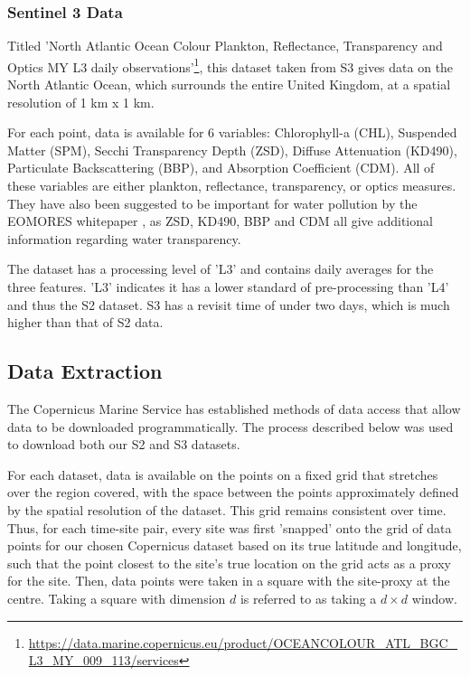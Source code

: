 \documentclass[a4paper,11pt]{report}
\begin{document}
\subsubsection{Sentinel 3 Data}

Titled 'North Atlantic Ocean Colour Plankton, Reflectance, Transparency and Optics MY L3 daily observations'\footnote{\href{https://data.marine.copernicus.eu/product/OCEANCOLOUR_ATL_BGC_L3_MY_009_113/services}{https://data.marine.copernicus.eu/product/OCEANCOLOUR\_ATL\_BGC\_L3\_MY\_009\_113/services}}, this dataset taken from S3 gives data on the North Atlantic Ocean, which surrounds the entire United Kingdom, at a spatial resolution of 1 km x 1 km. 

For each point, data is available for 6 variables: Chlorophyll-a (CHL), Suspended Matter (SPM), Secchi Transparency Depth (ZSD), Diffuse Attenuation (KD490), Particulate Backscattering (BBP), and Absorption Coefficient (CDM). All of these variables are either plankton, reflectance, transparency, or optics measures. They have also been suggested to be important for water pollution by the EOMORES whitepaper \citep{papathanasopoulou2019satellite}, as ZSD, KD490, BBP and CDM all give additional information regarding water transparency. 

The dataset has a processing level of 'L3' and contains daily averages for the three features. 'L3' indicates it has a lower standard of pre-processing than 'L4' and thus the S2 dataset. S3 has a revisit time of under two days, which is much higher than that of S2 data.


\subsection{Data Extraction}

The Copernicus Marine Service has established methods of data access that allow data to be downloaded programmatically. The process described below was used to download both our S2 and S3 datasets. 

For each dataset, data is available on the points on a fixed grid that stretches over the region covered, with the space between the points approximately defined by the spatial resolution of the dataset. This grid remains consistent over time. Thus, for each time-site pair, every site was first 'snapped' onto the grid of data points for our chosen Copernicus dataset based on its true latitude and longitude, such that the point closest to the site's true location on the grid acts as a proxy for the site. Then, data points were taken in a square with the site-proxy at the centre. Taking a square with dimension $d$ is referred to as taking a $d \times d$ window.
\end{document}
